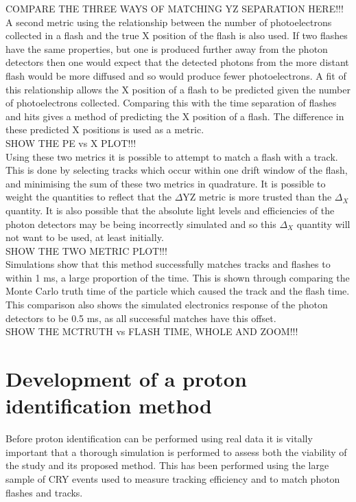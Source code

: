 \documentclass[11pt]{report} %
\begin{document}
{COMPARE THE THREE WAYS OF MATCHING YZ SEPARATION HERE!!! \\

A second metric using the relationship between the number of photoelectrons collected in a flash and the true X position of the flash is also used. If two flashes have the same properties, but one is produced further away from the photon detectors then one would expect that the detected photons from the more distant flash would be more diffused and so would produce fewer photoelectrons. A fit of this relationship allows the X position of a flash to be predicted given the number of photoelectrons collected. Comparing this with the time separation of flashes and hits gives a method of predicting the X position of a flash. The difference in these predicted X positions is used as a metric. \\

SHOW THE PE vs X PLOT!!! \\

Using these two metrics it is possible to attempt to match a flash with a track. This is done by selecting tracks which occur within one drift window of the flash, and minimising the sum of these two metrics in quadrature. It is possible to weight the quantities to reflect that the $\Delta$YZ metric is more trusted than the $\Delta_X$ quantity. It is also possible that the absolute light levels and efficiencies of the photon detectors may be being incorrectly simulated and so this $\Delta_X$ quantity will not want to be used, at least initially. \\

SHOW THE TWO METRIC PLOT!!! \\

Simulations show that this method successfully matches tracks and flashes to within 1 ms, a large proportion of the time. This is shown through comparing the Monte Carlo truth time of the particle which caused the track and the flash time. This comparison also shows the simulated electronics response of the photon detectors to be 0.5 ms, as all successful matches have this offset. \\

SHOW THE MCTRUTH vs FLASH TIME, WHOLE AND ZOOM!!! 

\section{Development of a proton identification method}
Before proton identification can be performed using real data it is vitally important that a thorough simulation is performed to assess both the viability of the study and its proposed method. This has been performed using the large sample of CRY events used to measure tracking efficiency and to match photon flashes and tracks. \\

}
\end{document}
